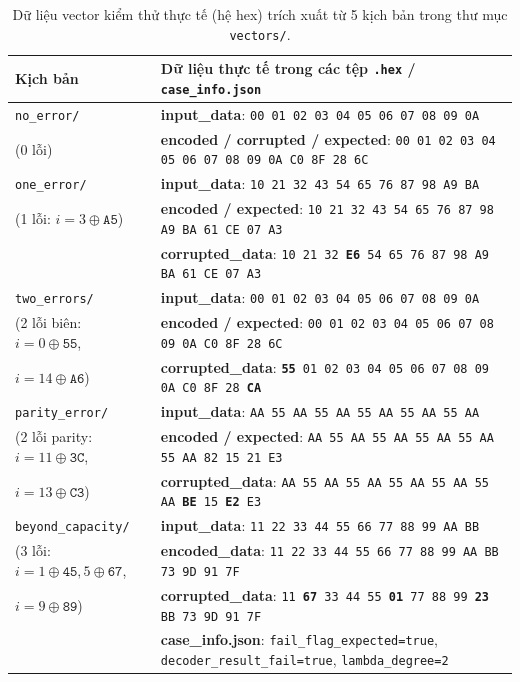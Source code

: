\begin{table}[!htb]
\centering
\caption{Dữ liệu vector kiểm thử thực tế (hệ hex) trích xuất từ 5 kịch bản trong thư mục \texttt{vectors/}.}
\label{tab:vectors_hex_data}
\scriptsize
\renewcommand{\arraystretch}{1.05}
\begin{tabular}{@{} l p{11.6cm} @{}}
\toprule
Kịch bản & Dữ liệu thực tế trong các tệp \texttt{.hex} / \texttt{case\_info.json} \\
\midrule
\texttt{no\_error/} &
\textbf{input\_data}: \texttt{00 01 02 03 04 05 06 07 08 09 0A} \\
(0 lỗi) & \textbf{encoded / corrupted / expected}: \texttt{00 01 02 03 04 05 06 07 08 09 0A C0 8F 28 6C} \\
\midrule
\texttt{one\_error/} &
\textbf{input\_data}: \texttt{10 21 32 43 54 65 76 87 98 A9 BA} \\
(1 lỗi: $i=3 \oplus \texttt{A5}$) & \textbf{encoded / expected}: \texttt{10 21 32 43 54 65 76 87 98 A9 BA 61 CE 07 A3} \\
& \textbf{corrupted\_data}: \texttt{10 21 32 \textbf{E6} 54 65 76 87 98 A9 BA 61 CE 07 A3} \\
\midrule
\texttt{two\_errors/} &
\textbf{input\_data}: \texttt{00 01 02 03 04 05 06 07 08 09 0A} \\
(2 lỗi biên: $i=0 \oplus \texttt{55}$, & \textbf{encoded / expected}: \texttt{00 01 02 03 04 05 06 07 08 09 0A C0 8F 28 6C} \\
$i=14 \oplus \texttt{A6}$) & \textbf{corrupted\_data}: \texttt{\textbf{55} 01 02 03 04 05 06 07 08 09 0A C0 8F 28 \textbf{CA}} \\
\midrule
\texttt{parity\_error/} &
\textbf{input\_data}: \texttt{AA 55 AA 55 AA 55 AA 55 AA 55 AA} \\
(2 lỗi parity: $i=11 \oplus \texttt{3C}$, & \textbf{encoded / expected}: \texttt{AA 55 AA 55 AA 55 AA 55 AA 55 AA 82 15 21 E3} \\
$i=13 \oplus \texttt{C3}$) & \textbf{corrupted\_data}: \texttt{AA 55 AA 55 AA 55 AA 55 AA 55 AA \textbf{BE} 15 \textbf{E2} E3} \\
\midrule
\texttt{beyond\_capacity/} &
\textbf{input\_data}: \texttt{11 22 33 44 55 66 77 88 99 AA BB} \\
(3 lỗi: $i=1\oplus\texttt{45}, 5\oplus\texttt{67}$, & \textbf{encoded\_data}: \texttt{11 22 33 44 55 66 77 88 99 AA BB 73 9D 91 7F} \\
$i=9\oplus\texttt{89}$) & \textbf{corrupted\_data}: \texttt{11 \textbf{67} 33 44 55 \textbf{01} 77 88 99 \textbf{23} BB 73 9D 91 7F} \\
& \textbf{case\_info.json}: \texttt{fail\_flag\_expected=true}, \texttt{decoder\_result\_fail=true}, \texttt{lambda\_degree=2} \\
\bottomrule
\end{tabular}
\end{table}

